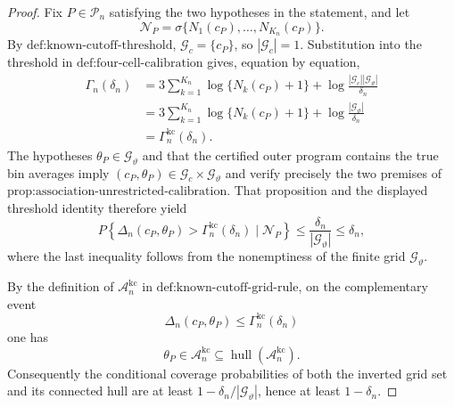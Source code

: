 \documentclass{article}
\begin{document}
\begin{proof}
Fix \(P\in\mathcal P_n\) satisfying the two hypotheses in the statement, and let
\[
\mathscr N_P=\sigma\{N_1(c_P),\ldots,N_{K_n}(c_P)\}.
\]
By \(\text{def:known-cutoff-threshold}\), \(\mathcal G_c=\{c_P\}\), so \(|\mathcal G_c|=1\).  Substitution into the threshold in \(\text{def:four-cell-calibration}\) gives, equation by equation,
\[
\begin{aligned}
\Gamma_n(\delta_n)
&=3\sum_{k=1}^{K_n}\log\{N_k(c_P)+1\}
  +\log\frac{|\mathcal G_c||\mathcal G_\vartheta|}{\delta_n}\\
&=3\sum_{k=1}^{K_n}\log\{N_k(c_P)+1\}
  +\log\frac{|\mathcal G_\vartheta|}{\delta_n}\\
&=\Gamma_n^{\mathrm{kc}}(\delta_n).
\end{aligned}
\]
The hypotheses \(\theta_P\in\mathcal G_\vartheta\) and that the certified outer program contains the true bin averages imply
\((c_P,\theta_P)\in\mathcal G_c\times\mathcal G_\vartheta\) and verify precisely the two premises of \(\text{prop:association-unrestricted-calibration}\).  That proposition and the displayed threshold identity therefore yield
\[
P\!\left\{\Delta_n(c_P,\theta_P)>\Gamma_n^{\mathrm{kc}}(\delta_n)\mid\mathscr N_P\right\}
\le \frac{\delta_n}{|\mathcal G_\vartheta|}
\le\delta_n,
\]
where the last inequality follows from the nonemptiness of the finite grid \(\mathcal G_\vartheta\).

By the definition of \(\mathcal A_n^{\mathrm{kc}}\) in \(\text{def:known-cutoff-grid-rule}\), on the complementary event
\[
\Delta_n(c_P,\theta_P)\le\Gamma_n^{\mathrm{kc}}(\delta_n)
\]
one has
\[
\theta_P\in\mathcal A_n^{\mathrm{kc}}
\subseteq\operatorname{hull}(\mathcal A_n^{\mathrm{kc}}).
\]
Consequently the conditional coverage probabilities of both the inverted grid set and its connected hull are at least \(1-\delta_n/|\mathcal G_\vartheta|\), hence at least \(1-\delta_n\).


\end{proof}
\end{document}
